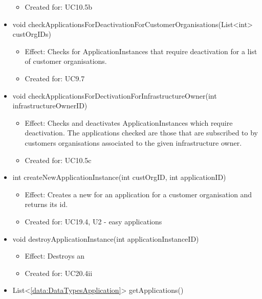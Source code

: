 \begin{description}
\begin{itemize}[noitemsep,nolistsep,leftmargin=-.25cm]
\begin{itemize}[noitemsep,nolistsep]
\item Created for: UC10.5b
        \end{itemize}
      \item \textsf{void checkApplicationsForDeactivationForCustomerOrganisations(List\textless{}int\textgreater{} custOrgIDs)}
        \begin{itemize}[noitemsep,nolistsep]
           \item Effect: Checks for ApplicationInstances that require deactivation for a list of customer organisations.
\item Created for: UC9.7
        \end{itemize}
      \item \textsf{void checkApplicationsForDectivationForInfrastructureOwner(int infrastructureOwnerID)}
        \begin{itemize}[noitemsep,nolistsep]
           \item Effect: Checks and deactivates ApplicationInstances which require deactivation. The applications checked are those that are subscribed to by customers organisations associated to the given infrastructure owner.
\item Created for: UC10.5c
        \end{itemize}
      \item \textsf{int createNewApplicationInstance(int custOrgID, int applicationID)}
        \begin{itemize}[noitemsep,nolistsep]
           \item Effect: Creates a new  for an application for a customer organisation and returns its id.
\item Created for: UC19.4, U2 - easy applications
        \end{itemize}
      \item \textsf{void destroyApplicationInstance(int applicationInstanceID)}
        \begin{itemize}[noitemsep,nolistsep]
           \item Effect: Destroys an 
\item Created for: UC20.4ii
        \end{itemize}
      \item \textsf{List\textless{}\ref{data:DataTypesApplication}\textgreater{} getApplications()}
        \begin{itemize}

\end{itemize}
\end{itemize}
\end{description}

